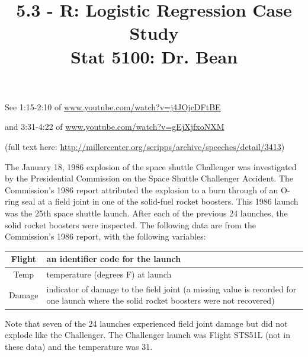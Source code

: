 \documentclass{article}\usepackage[]{graphicx}\usepackage[]{color}
\begin{document}
\title{%
5.3 - R: Logistic Regression Case Study \\
\smallskip
\large Stat 5100: Dr. Bean
}
\date{}

\maketitle

See 1:15-2:10 of \href{www.youtube.com/watch?v=j4JOjcDFtBE}{www.youtube.com/watch?v=j4JOjcDFtBE}

and 3:31-4:22 of \href{www.youtube.com/watch?v=gEjXjfxoNXM}{www.youtube.com/watch?v=gEjXjfxoNXM}

(full text here:
\href{http://millercenter.org/scripps/archive/speeches/detail/3413}{http://millercenter.org/scripps/archive/speeches/detail/3413})

The January 18, 1986 explosion of the space shuttle Challenger was investigated by the
Presidential Commission on the Space Shuttle Challenger Accident. The Commission's
1986 report attributed the explosion to a burn through of an O-ring seal at a field joint in
one of the solid-fuel rocket boosters. This 1986 launch was the 25th space shuttle launch.
After each of the previous 24 launches, the solid rocket boosters were inspected.
The following data are from the Commission's 1986 report, with the following variables:

\begin{center}
\begin{tabular}{|c|p{8cm}|}
\hline
Flight & an identifier code for the launch \\
\hline
Temp & temperature (degrees F) at launch \\
\hline
Damage & indicator of damage to the field joint (a missing value is recorded for one launch where the solid rocket boosters were not recovered) \\
\hline
\end{tabular}
\end{center}

Note that seven of the 24 launches experienced field joint damage but did not explode
like the Challenger. The Challenger launch was Flight STS51L (not in these data)
and the temperature was 31.
\end{document}
